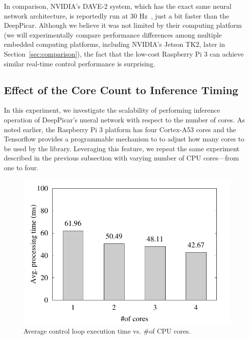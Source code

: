 In comparison, NVIDIA's DAVE-2 system, which has the exact same neural
network architecture, is reportedly run at 30 Hz~\cite{Bojarski2016},
just a bit faster than the DeepPicar. Although we believe it was not
limited by their computing platform (we will experimentally compare
performance differences among multiple embedded computing platforms,
including NVIDIA's Jetson TK2, later in
Section~\ref{sec:comparison}), the fact that the low-cost
Raspberry Pi 3 can achieve similar real-time control performance is
surprising.

\subsection{Effect of the Core Count to Inference Timing}

In this experiment, we investigate the scalability of performing
inference operation of DeepPicar's nueral network with respect to the
number of cores. As noted earlier, the Raspberry Pi 3 platform has
four Cortex-A53 cores and the Tensorflow 
provides a programmable mechanism to to adjust how many cores to be
used by the library. Leveraging this feature, we repeat the
same experiment described in the previous subsection with varying
number of CPU cores---from one to four.


\begin{figure}[h]
  \centering
  \includegraphics[width=.45\textwidth]{figs/perf_vs_corecnt}
  \caption{Average control loop execution time vs. \#of CPU
    cores. }
  \label{fig:perf-vs-corecnt}
\end{figure}


